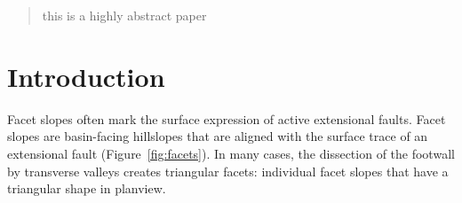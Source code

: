\begin{abstract}
this is a highly abstract paper
\end{abstract}

%
%

%



%
%
%


\section{Introduction}
\label{sec:intro}

Facet slopes often mark the surface expression of active extensional faults. Facet slopes are basin-facing hillslopes that are aligned with the surface trace of an extensional fault (Figure~\ref{fig:facets}). In many cases, the dissection of the footwall by transverse valleys creates triangular facets: individual facet slopes that have a triangular shape in planview. 






